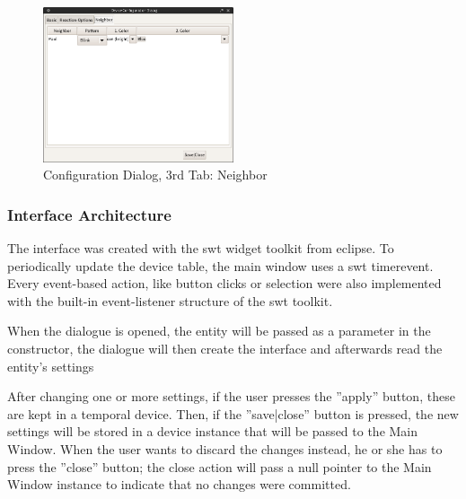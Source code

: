 \begin{figure}[h!]
 \centering
 \includegraphics[width= 0.5\textwidth, clip=true  ,keepaspectratio=true]{./pic/java-server-config03.png}
 \caption{Configuration Dialog, 3rd Tab: Neighbor}
 \label{fig:java-server-config03}
\end{figure}

\subsubsection{Interface Architecture}
The interface was created with the swt widget toolkit from eclipse. %
To periodically update the device table, the main window uses a swt timerevent. Every event-based action, like button clicks or selection were also implemented with the built-in event-listener structure of the swt toolkit. %

When the dialogue is opened, the entity will be passed as a parameter in the constructor, the dialogue will then create the interface and afterwards read the entity's settings %

After changing one or more settings, if the user presses the ''apply'' button, these are kept in a temporal device. Then, if the ''save|close'' button is pressed, the new settings will be stored in a device instance that will be passed to the Main Window. When the user wants to discard the changes instead, he or she has to press the ''close'' button; the close action will pass a null pointer to the Main Window instance to indicate that no changes were committed. 


